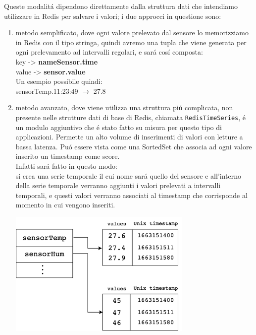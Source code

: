 Queste modalitá dipendono direttamente dalla struttura dati che intendiamo utilizzare in Redis per salvare i valori;
i due approcci in questione sono:
\begin{enumerate}
    \item metodo semplificato, dove ogni valore prelevato dal sensore lo memorizziamo in Redis con il tipo stringa,
          quindi avremo una tupla che viene generata per ogni prelevamento ad intervalli regolari, e sará cosí composta:\\
          key -> \textbf{nameSensor.time}\\
          value -> \textbf{sensor.value} \\
          Un esempio possibile quindi:\\
          sensorTemp.11:23:49 $\to$ 27.8
    \item metodo avanzato, dove viene utilizza una struttura piú complicata, non presente nelle strutture dati di base di Redis,
          chiamata \texttt{RedisTimeSeries}, é un modulo aggiuntivo che é stato fatto su misura per questo tipo di applicazioni.
          Permette un alto volume di inserimenti di valori con letture a bassa latenza. Puó essere vista come una SortedSet che associa
          ad ogni valore inserito un timestamp come score.\\
          Infatti sará fatto in questo modo:\\
          si crea una serie temporale il cui nome sará quello del sensore e all'interno della serie temporale verranno aggiunti i valori
          prelevati a intervalli temporali, e questi valori verranno associati al timestamp che corrisponde
          al momento in cui vengono inseriti.

     \includegraphics[width=0.7\textwidth]{img/redistimeseries}
\end{enumerate}






























